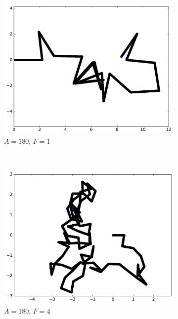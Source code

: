 \begin{figure}[htb]
\begin{subfigure}[t]{\subImgWmo}
			\includegraphics[width=\textwidth]{figures/ch3/synTraj_219_180_1}
			\caption[$A = 180$, $F=1$]{$A = 180$, $F=1$}
			\label{fig:synTraj_219_180_1}
		\end{subfigure}
		~
		\begin{subfigure}[t]{\subImgWmo}
			\centering
			\includegraphics[width=\textwidth]{figures/ch3/synTraj_219_180_4}
			\caption[$A = 180$, $F=4$]{$A = 180$, $F=4$}
			\label{fig:synTraj_219_180_4}
		\end{subfigure}
		~
		\begin{subfigure}[t]{\subImgWmo}
			\centering

\end{subfigure}
\end{figure}
